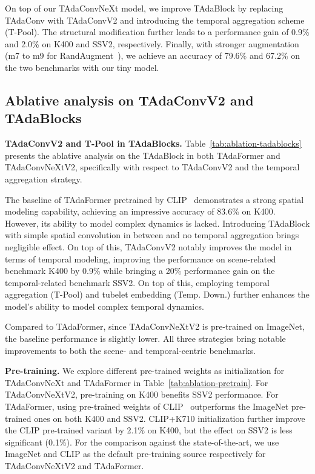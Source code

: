 \documentclass[10pt,journal,compsoc]{IEEEtran}
\begin{document}
On top of our TAdaConvNeXt model, we improve TAdaBlock by replacing TAdaConv with TAdaConvV2 and introducing the temporal aggregation scheme (T-Pool). The structural modification further leads to a performance gain of 0.9\% and 2.0\% on K400 and SSV2, respectively. Finally, with stronger augmentation (m7 to m9 for RandAugment~\cite{randaugment}), we achieve an accuracy of 79.6\% and 67.2\% on the two benchmarks with our tiny model. 

\subsection{Ablative analysis on TAdaConvV2 and TAdaBlocks}

\textbf{TAdaConvV2 and T-Pool in TAdaBlocks.} Table~\ref{tab:ablation-tadablocks} presents the ablative analysis on the TAdaBlock in both TAdaFormer and TAdaConvNeXtV2, specifically with respect to TAdaConvV2 and the temporal aggregation strategy. 

The baseline of TAdaFormer pretrained by CLIP~\cite{radford2021clip} demonstrates a strong spatial modeling capability, achieving an impressive accuracy of 83.6\% on K400. However, its ability to model complex dynamics is lacked. 
Introducing TAdaBlock with simple spatial convolution in between and no temporal aggregation brings negligible effect. 
On top of this, TAdaConvV2 notably improves the model in terms of temporal modeling, improving the performance on scene-related benchmark K400 by 0.9\% while bringing a 20\% performance gain on the temporal-related benchmark SSV2. On top of this, employing temporal aggregation (T-Pool) and tubelet embedding (Temp. Down.) further enhances the model's ability to model complex temporal dynamics. 

Compared to TAdaFormer, since TAdaConvNeXtV2 is pre-trained on ImageNet, the baseline performance is slightly lower. All three strategies bring notable improvements to both the scene- and temporal-centric benchmarks. 

\textbf{Pre-training. }We explore different pre-trained weights as initialization for TAdaConvNeXt and TAdaFormer in Table~\ref{tab:ablation-pretrain}. For TAdaConvNeXtV2, pre-training on K400 benefits SSV2 performance. For TAdaFormer, using pre-trained weights of CLIP~\cite{radford2021clip} outperforms the ImageNet pre-trained ones on both K400 and SSV2. 
CLIP+K710 initialization further improve the CLIP pre-trained variant by 2.1\% on K400, but the effect on SSV2 is less significant (0.1\%).
For the comparison against the state-of-the-art, we use ImageNet and CLIP as the default pre-training source respectively for TAdaConvNeXtV2 and TAdaFormer.
\end{document}
